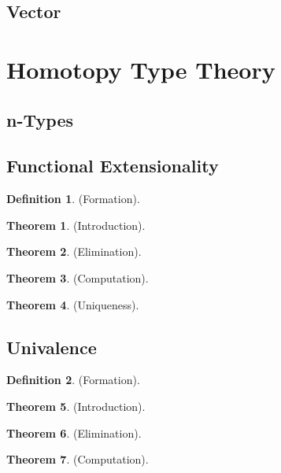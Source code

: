 \documentclass{article}
\theoremstyle{definition}
\newtheorem{definition}{Definition}
\newtheorem{theorem}{Theorem}
\begin{document}
\subsection{Vector}

\section{Homotopy Type Theory}

\subsection{n-Types}

\subsection{Functional Extensionality}


\begin{definition} (Formation).
\end{definition}

\begin{theorem} (Introduction).
\end{theorem}

\begin{theorem} (Elimination).
\end{theorem}

\begin{theorem} (Computation).
\end{theorem}

\begin{theorem} (Uniqueness).
\end{theorem}

\subsection{Univalence}

\begin{definition} (Formation).
\end{definition}

\begin{theorem} (Introduction).
\end{theorem}

\begin{theorem} (Elimination).
\end{theorem}

\begin{theorem} (Computation).
\end{theorem}
\end{document}
